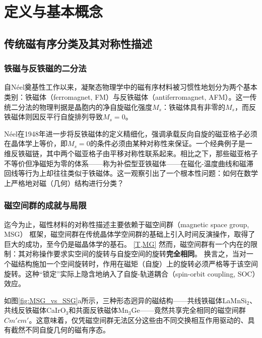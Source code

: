 
\chapter{定义与基本概念}
\label{chap:definition}

\section{传统磁有序分类及其对称性描述}

\subsection{铁磁与反铁磁的二分法}

自N\'{e}el奠基性工作以来，凝聚态物理学中的磁有序材料被习惯性地划分为两个基本类别：铁磁体（ferromagnet, FM）与反铁磁体（antiferromagnet, AFM）。这一传统二分法的物理判据是晶胞内的净自旋磁化强度$M_s$：铁磁体具有非零的$M_s$，而反铁磁体则因反平行自旋排列导致$M_s=0$。

N\'{e}el在1948年进一步将反铁磁体的定义精细化，强调承载反向自旋的磁亚格子必须在晶体学上等价，即$M_s=0$的条件必须由某种对称性来保证\cite{liu_symmetry_2026}。一个经典例子是一维反铁磁链，其中两个磁亚格子由平移对称性联系起来。相比之下，那些磁亚格子不等价但净磁矩为零的体系——称为补偿型亚铁磁体——在磁化-温度曲线和磁滞回线等行为上却往往类似于铁磁体\cite{liu_symmetry_2026}。这一观察引出了一个根本性问题：如何在数学上严格地对磁（几何）结构进行分类？

\subsection{磁空间群的成就与局限}

迄今为止，磁性材料的对称性描述主要依赖于磁空间群（magnetic space group, MSG）
框架，磁空间群在传统晶体学空间群的基础上引入时间反演操作，取得了巨大的成功，至今仍是磁晶体学的基石。
\autoref{T,MG}
然而，磁空间群有一个内在的限制：其对称操作要求实空间的旋转与自旋空间的旋转\textbf{完全相同}。
换言之，当对一个磁结构施加一个空间旋转时，作用在磁矩（自旋）上的旋转必须严格等于该空间旋转\cite{liu_symmetry_2026,Smejkal2022PRX}。这种“锁定”实际上隐含地纳入了自旋-轨道耦合（spin-orbit coupling, SOC）效应。

如图\ref{fig:MSG_vs_SSG}a所示，三种形态迥异的磁结构——共线铁磁体LaMnSi$_2$、共线反铁磁体CaIrO$_3$和共面反铁磁体Mn$_3$Ge——竟然共享完全相同的磁空间群$Cm'cm'$。这意味着，仅凭磁空间群无法区分这些由不同交换相互作用驱动的、具有截然不同自旋几何的磁有序态。

